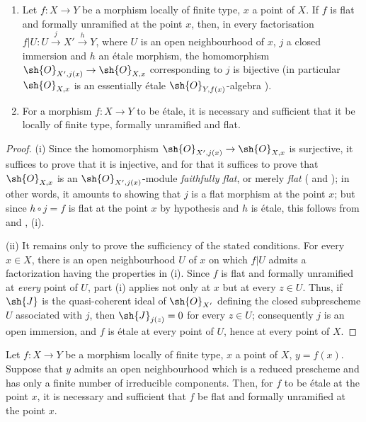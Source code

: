 \begin{corollary}[18.4.12]
\label{IV.18.4.12}
\begin{enumerate}
  \item[(i)] Let $f:X\to Y$ be a morphism locally of finite type, $x$ a point of $X$.
If $f$ is flat and formally unramified at the point $x$, then, in every factorisation $f|U:U\xrightarrow{j}X'\xrightarrow{h}Y$, where $U$ is an open neighbourhood of $x$, $j$ a closed immersion and $h$ an \'etale morphism, the homomorphism $\sh{O}_{X',j(x)}\to\sh{O}_{X,x}$ corresponding to $j$ is bijective (in particular $\sh{O}_{X,x}$ is an essentially \'etale $\sh{O}_{Y,f(x)}$-algebra ).
  \item[(ii)] For a morphism $f:X\to Y$ to be \'etale, it is necessary and sufficient that it be locally of finite type, formally unramified and flat.
\end{enumerate}
\end{corollary}

\begin{proof}
(i) Since the homomorphism $\sh{O}_{X',j(x)}\to\sh{O}_{X,x}$ is surjective, it suffices to prove that it is injective, and for that it suffices to prove that $\sh{O}_{X,x}$ is an $\sh{O}_{X',j(x)}$-module \emph{faithfully flat}, or merely \emph{flat} ( and );
in other words, it amounts to showing that $j$ is a flat morphism at the point $x$;
but since $h\circ j=f$ is flat at the point $x$ by hypothesis and $h$ is \'etale, this follows from  and , (i).

(ii) It remains only to prove the sufficiency of the stated conditions.
For every $x\in X$, there is an open neighbourhood $U$ of $x$ on which $f|U$ admits a factorization having the properties in (i).
Since $f$ is flat and formally unramified at \emph{every} point of $U$, part (i) applies not only at $x$ but at every $z\in U$.
Thus, if $\sh{J}$ is the quasi-coherent ideal of $\sh{O}_{X'}$ defining the closed subprescheme $U$ associated with $j$, then $\sh{J}_{j(z)}=0$ for every $z\in U$; consequently $j$ is an open immersion, and $f$ is \'etale at every point of $U$, hence at every point of $X$.
\end{proof}

\begin{corollary}[18.4.13]
\label{IV.18.4.13}
Let $f:X\to Y$ be a morphism locally of finite type, $x$ a point of $X$, $y=f(x)$.
Suppose that $y$ admits an open neighbourhood which is a reduced prescheme and has only a finite number of irreducible components.
Then, for $f$ to be \'etale at the point $x$, it is necessary and sufficient that $f$ be flat and formally unramified at the point $x$.
\end{corollary}

